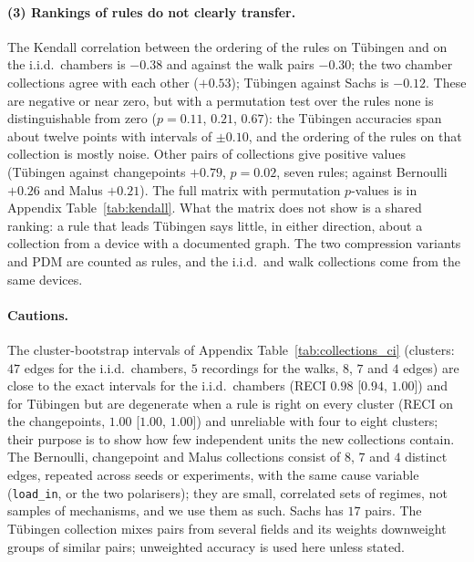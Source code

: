 \paragraph{(3) Rankings of rules do not clearly transfer.} The Kendall correlation between the ordering of the rules on T\"ubingen and on the i.i.d.\ chambers is $-0.38$ and against the walk pairs $-0.30$; the two chamber collections agree with each other ($+0.53$); T\"ubingen against Sachs is $-0.12$. These are negative or near zero, but with a permutation test over the rules none is distinguishable from zero ($p=0.11$, $0.21$, $0.67$): the T\"ubingen accuracies span about twelve points with intervals of $\pm0.10$, and the ordering of the rules on that collection is mostly noise. Other pairs of collections give positive values (T\"ubingen against changepoints $+0.79$, $p=0.02$, seven rules; against Bernoulli $+0.26$ and Malus $+0.21$). The full matrix with permutation $p$-values is in Appendix Table~\ref{tab:kendall}. What the matrix does not show is a shared ranking: a rule that leads T\"ubingen says little, in either direction, about a collection from a device with a documented graph. The two compression variants and PDM are counted as rules, and the i.i.d.\ and walk collections come from the same devices.

\paragraph{Cautions.} The cluster-bootstrap intervals of Appendix Table~\ref{tab:collections_ci} (clusters: $47$ edges for the i.i.d.\ chambers, $5$ recordings for the walks, $8$, $7$ and $4$ edges) are close to the exact intervals for the i.i.d.\ chambers (RECI $0.98$ [$0.94$, $1.00$]) and for T\"ubingen but are degenerate when a rule is right on every cluster (RECI on the changepoints, $1.00$ [$1.00$, $1.00$]) and unreliable with four to eight clusters; their purpose is to show how few independent units the new collections contain. The Bernoulli, changepoint and Malus collections consist of $8$, $7$ and $4$ distinct edges, repeated across seeds or experiments, with the same cause variable (\texttt{load\_in}, or the two polarisers); they are small, correlated sets of regimes, not samples of mechanisms, and we use them as such. Sachs has $17$ pairs. The T\"ubingen collection mixes pairs from several fields and its weights downweight groups of similar pairs; unweighted accuracy is used here unless stated.
